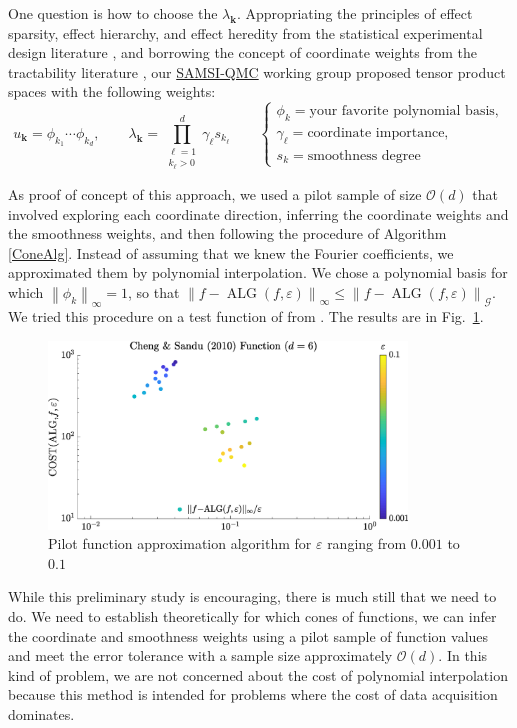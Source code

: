 \documentclass[11pt]{NSFamsart}
\newcommand{\SAMSIQMC}{\hyperlink{SAMSIlink}{SAMSI-QMC}\xspace}
\DeclareMathOperator{\ALG}{ALG}
\newcommand{\bk}{{\boldsymbol{k}}}
\newcommand{\calg}{{\mathcal{G}}}
\newcommand{\norm}[2][{}]{\ensuremath{\left \lVert #2 \right \rVert}_{#1}}
\newcommand{\Order}{\mathcal{O}}
\begin{document}
One question is how to choose the $\lambda_{\bk}$.  Appropriating the principles of effect sparsity, effect hierarchy, and effect heredity from the statistical experimental design literature \cite{WuHam00}, and borrowing the concept of coordinate weights from the tractability literature \cite{DicEtal14a}, our \SAMSIQMC working group proposed tensor product spaces with the following weights:
\[
u_{\bk} = \phi_{k_1} \cdots \phi_{k_d}, \qquad \lambda_{\bk} = \prod_{\substack{\ell = 1 \\ k_{\ell} > 0 }}^d \gamma_{\ell}s_{k_\ell} 
\qquad \begin{cases} \phi_k = \text{your favorite polynomial basis}, \\
\gamma_{\ell} = \text{coordinate importance}, \\
s_{k} = \text{smoothness degree}
\end{cases}
\]

As proof of concept of this approach, we used a pilot sample of size $\Order(d)$ that involved exploring each coordinate direction, inferring the coordinate weights and the smoothness weights, and then following the procedure of Algorithm \ref{ConeAlg}.  Instead of assuming that we knew the Fourier coefficients, we approximated them by polynomial interpolation.  We chose a polynomial basis for which $\norm[\infty]{\phi_k} = 1$, so that $\norm[\infty]{f - \ALG(f,\varepsilon)} \le \norm[\calg]{f - \ALG(f,\varepsilon)}$.  We tried this procedure on a test function of \cite{ChenSan10a} from \cite{VirLib17a}.  The results are in Fig.\ \ref{fig:ChengSand}.

\begin{figure}
    \centering
    \includegraphics[height = 5cm]{ProgramsImages/sim_eval_results_chsan10_d6_sflg1ErrN.eps}
    \caption{Pilot function approximation algorithm for $\varepsilon$ ranging from $0.001$ to $0.1$}
    \label{fig:ChengSand}
\end{figure}

While this preliminary study is encouraging, there is much still that we need to do.  We need to establish theoretically for which cones of functions, we can infer the coordinate and smoothness weights using a pilot sample of function values and meet the error tolerance with a sample size approximately $\Order(d)$.  In this kind of problem, we are not concerned about the cost of polynomial interpolation because this method is intended for problems where the cost of data acquisition dominates.
\end{document}
